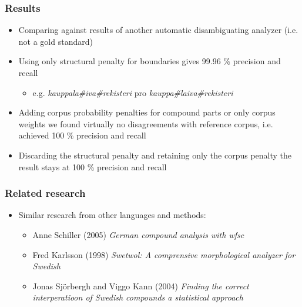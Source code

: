 \documentclass[utf8]{beamer}
\begin{document}
\begin{frame}
\frametitle{Results}
\begin{itemize}
\item Comparing against results of another automatic disambiguating analyzer (i.e. not a gold standard)
\item Using only structural penalty for boundaries gives 99.96 \% precision and recall
\begin{itemize}
\item e.g. \emph{kauppala\#iva\#rekisteri} pro \emph{kauppa\#laiva\#rekisteri}
\end{itemize}
\item Adding corpus probability penalties for compound parts or only corpus weights we found
virtually no disagreements with reference corpus, i.e. achieved 100 \% precision
and recall
\item Discarding the structural penalty and retaining only the corpus penalty the result stays at 100 \% precision and recall
\end{itemize}
\end{frame}

\begin{frame}
\frametitle{Related research}
\begin{itemize}
\item Similar research from other languages and methods:
\begin{itemize}
\item Anne Schiller (2005) \emph{German compound analysis with \emph{wfsc}}
\item Fred Karlsson (1998) \emph{Swetwol: A comprensive morphological analyzer for Swedish}
\item Jonas Sjörbergh and Viggo Kann (2004) \emph{Finding the correct interperatioon of Swedish compounds a statistical approach}
\end{itemize}
\end{itemize}
\end{frame}
\end{document}
